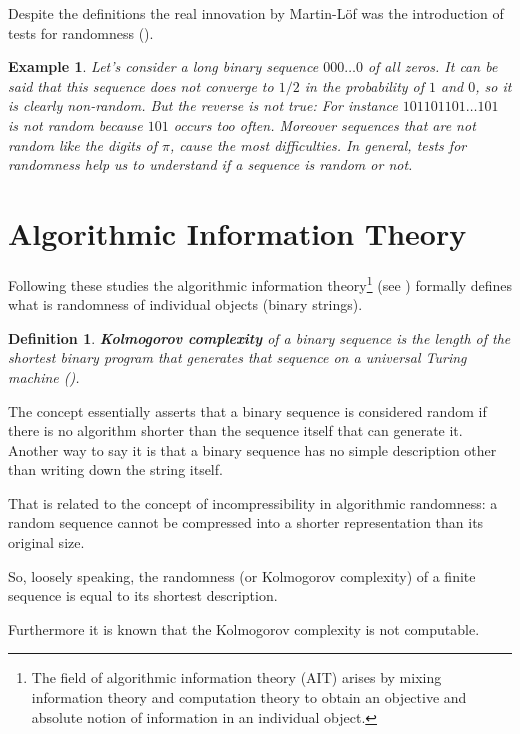 \documentclass[12pt, a4paper]{report}
\newtheorem{definition}{Definition}[section] %
\newtheorem{example}{Example} %
\begin{document}
Despite the definitions the real innovation by Martin-Löf was the introduction of tests for randomness
(\cite{TheDefinitionOfRandomSequences}).

\begin{example}
Let's consider a long binary sequence \(000\dots0\) of all zeros.
It can be said that this sequence does not converge to \(1/2\) in the probability of \(1\) and \(0\), so it is clearly non-random.
But the reverse is not true: For instance \(101101101\dots101\) is not random because \(101\) occurs too often.
Moreover sequences that are not random like the digits of \(\pi\), cause the most difficulties.
In general, tests for randomness help us to understand if a sequence is random or not.
\end{example}

\section{Algorithmic Information Theory}

Following these studies the algorithmic information theory\footnote{The field of algorithmic information theory (AIT) arises by
mixing information theory and computation theory to obtain an objective and absolute notion of information in an individual
object.} (see \cite{AlgorithmicInformationTheoryBriefGuide}) formally defines what is randomness of individual objects
(binary strings).

\begin{definition}
\textbf{Kolmogorov complexity} of a binary sequence is the length of the shortest binary program that generates that sequence on a
universal Turing machine (\cite{ThreeApproachesToTheQuantitativeDefinitionOfInformation}).
\end{definition}

The concept essentially asserts that a binary sequence is considered random if there is no algorithm shorter than the sequence
itself that can generate it.
Another way to say it is that a binary sequence has no simple description other than writing down the string itself.

That is related to the concept of incompressibility in algorithmic randomness: a random sequence cannot be compressed into a
shorter representation than its original size.

So, loosely speaking, the randomness (or Kolmogorov complexity) of a finite sequence is equal to its shortest description.

Furthermore it is known that the Kolmogorov complexity is not computable.
\end{document}
